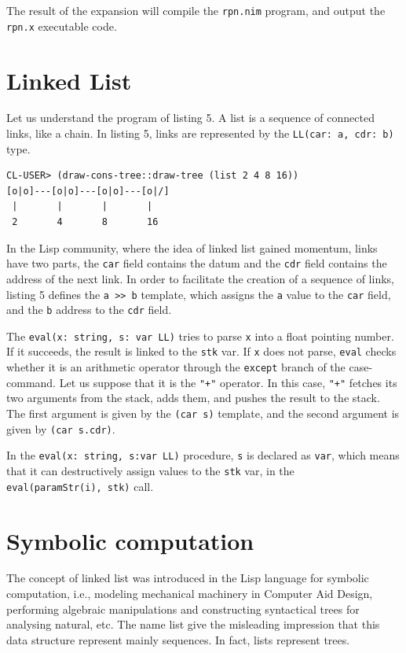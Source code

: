 \documentclass[
  12pt,
]{book}
\begin{document}
The result of the expansion will compile the \texttt{rpn.nim} program,
and output the \texttt{rpn.x} executable code.

\section{Linked List}\label{linked-list}

Let us understand the program of listing 5. A list is a sequence of
connected links, like a chain. In listing 5, links are represented by
the \texttt{LL(car:\ a,\ cdr:\ b)} type.

\begin{verbatim}
CL-USER> (draw-cons-tree::draw-tree (list 2 4 8 16))
[o|o]---[o|o]---[o|o]---[o|/]
 |       |       |       |
 2       4       8       16
\end{verbatim}

In the Lisp community, where the idea of linked list gained momentum,
links have two parts, the \texttt{car} field contains the datum and the
\texttt{cdr} field contains the address of the next link. In order to
facilitate the creation of a sequence of links, listing 5 defines the
\texttt{a\ \textgreater{}\textgreater{}\ b} template, which assigns the
\texttt{a} value to the \texttt{car} field, and the \texttt{b} address
to the \texttt{cdr} field.

The \texttt{eval(x:\ string,\ s:\ var\ LL)} tries to parse \texttt{x}
into a float pointing number. If it succeeds, the result is linked to
the \texttt{stk} var. If \texttt{x} does not parse, \texttt{eval} checks
whether it is an arithmetic operator through the \texttt{except} branch
of the case-command. Let us suppose that it is the \texttt{"+"}
operator. In this case, \texttt{"+"} fetches its two arguments from the
stack, adds them, and pushes the result to the stack. The first argument
is given by the \texttt{(car\ s)} template, and the second argument is
given by \texttt{(car\ s.cdr)}.

In the \texttt{eval(x:\ string,\ s:var\ LL)} procedure, \texttt{s} is
declared as \texttt{var}, which means that it can destructively assign
values to the \texttt{stk} var, in the \texttt{eval(paramStr(i),\ stk)}
call.

\section{Symbolic computation}\label{symbolic-computation}

The concept of linked list was introduced in the Lisp language for
symbolic computation, i.e., modeling mechanical machinery in Computer
Aid Design, performing algebraic manipulations and constructing
syntactical trees for analysing natural, etc. The name list give the
misleading impression that this data structure represent mainly
sequences. In fact, lists represent trees.
\end{document}
